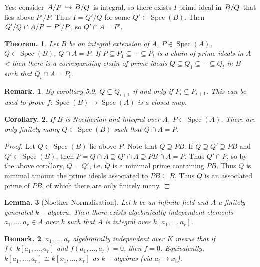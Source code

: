\documentclass[11pt, a4paper]{memoir}
\newcommand{\hto}[0]{\ensuremath{\hookrightarrow}}
\theoremstyle{change}
\newtheorem{theorem}{Theorem.}[section]
\newtheorem{lemma}[theorem]{Lemma.}
\newtheorem{corollary}[theorem]{Corollary.}
\theoremstyle{plain}
\theoremstyle{nonumberplain}
\newtheorem{remark}{Remark.}
\newtheorem{proof}{Proof}
\DeclareMathOperator{\Spec}{Spec}
\newcommand{\quot}[2]{\mathchoice{\left.\raisebox{0.10em}{$#1$}\middle/\raisebox{-0.10em}{$#2$}\right.}
                                 {\left.\raisebox{0.04em}{$#1$}\middle/\raisebox{-0.04em}{$#2$}\right.}
                                 {\left.\raisebox{0.01em}{$#1$}\middle/\raisebox{-0.01em}{$#2$}\right.}
                                 {\left.\raisebox{0em}{$#1$}\middle/\raisebox{0em}{$#2$}\right.}}
\numberwithin{equation}{section}
\begin{document}
Yes: consider $\quot{A}{P}\hto \quot{B}{Q}$ is integral, so there exists $I$ prime ideal in $\quot{B}{Q}$ that lies above $P'/P$.
Thus $I=Q'/Q$ for some $Q'\in\Spec(B)$.
Then $\quot{Q'}{Q}\cap A/P=P'/P$, so $Q'\cap A=P'$.
\begin{theorem}
    Let $B$ be an integral extension of $A$, $P\in\Spec(A)$, $Q\in\Spec(B)$, $Q\cap A=P$.
    If $P\subseteq P_1\subseteq\cdots\subseteq P_l$ is a chain of prime ideals in $A$< then there is a corresponding chain of prime ideals $Q\subseteq Q_1\subseteq\cdots\subseteq Q_l$ in $B$ such that $Q_i\cap A=P_i$.
\end{theorem}
\begin{remark}
    By corollary 5.9, $Q\subsetneq Q_{i+1}$ if and only if $P_i\subsetneq P_{i+1}$.
    This can be used to prove $f:\Spec(B)\to\Spec(A)$ is a closed map.
\end{remark}
\begin{corollary}
    If $B$ is Noetherian and integral over $A$, $P\in\Spec(A)$.
    There are only finitely many $Q\in\Spec(B)$ such that $Q\cap A=P$.
\end{corollary}
\begin{proof}
    Let $Q\in\Spec(B)$ lie above $P$.
    Note that $Q\supseteq PB$.
    If $Q\supseteq Q'\supseteq PB$ and $Q'\in\Spec(B)$, then $P=Q\cap A\supseteq Q'\cap A\supseteq PB\cap A=P$.
    Thus $Q'\cap P$, so by the above corollary, $Q=Q'$, i.e. $Q$ is a minimal prime containing $PB$.
    Thus $Q$ is minimal amount the prime ideals associated to $PB\subseteq B$.
    Thus $Q$ is an associated prime of $PB$, of which there are only finitely many.
\end{proof}
\begin{lemma}[Noether Normalisation]
    Let $k$ be an infinite field and $A$ a finitely generated $k-$algebra.
    Then there exists algebraically independent elements $a_1,\ldots,a_r\in A$ over $k$ such that $A$ is integral over $k[a_1,\ldots,a_r]$.
\end{lemma}
\begin{remark}
    $a_1,\ldots,a_r$ algebraically independent over $K$ meaus that if $f\in k[a_1,\ldots,a_r]$ and $f(a_1,\ldots,a_r)=0$, then $f=0$.
    Equivalently, $k[a_1,\ldots,a_r]\cong k[x_1,\ldots,x_r]$ as $k-$algebras (via $a_i\mapsto x_i$).
\end{remark}
\end{document}
